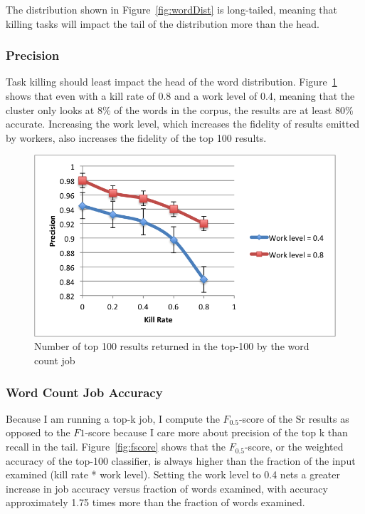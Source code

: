 \documentclass[12pt]{article}
\begin{document}
The distribution shown in Figure~\ref{fig:wordDist} is long-tailed, meaning that killing tasks will impact the tail of the distribution more than the head.

\subsubsection{Precision}
Task killing should least impact the head of the word distribution. Figure~\ref{fig:precision} shows that even with a kill rate of 0.8 and a work level of 0.4, meaning that the cluster only looks at 8\% of the words in the corpus, the results are at least 80\% accurate. Increasing the work level, which increases the fidelity of results emitted by workers, also increases the fidelity of the top 100 results.


\begin{figure}
\includegraphics[width=\linewidth]{top-100-precision.png}
\caption{Number of top 100 results returned in the top-100 by the word count job}
\label{fig:precision}
\end{figure}

\subsubsection{Word Count Job Accuracy}
Because I am running a top-k job, I compute the $F_{0.5}$-score of the Sr results as opposed to the $F1$-score because I care more about precision of the top k than recall in the tail. Figure~\ref{fig:fscore} shows that the $F_{0.5}$-score, or the weighted accuracy of the top-100 classifier, is always higher than the fraction of the input examined (kill rate * work level). Setting the work level to 0.4 nets a greater increase in job accuracy versus fraction of words examined, with accuracy approximately 1.75 times more than the fraction of words examined.
\end{document}
